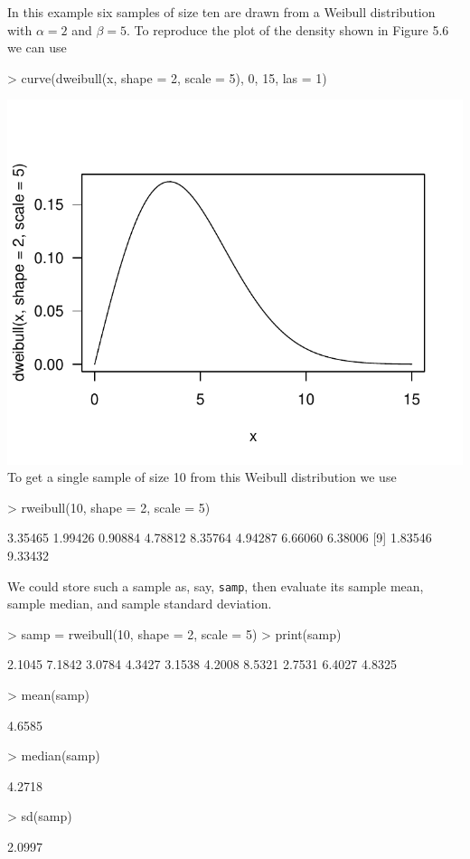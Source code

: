 \documentclass{book}
\begin{document}
In this example six samples of size ten are drawn from a Weibull
distribution with $\alpha=2$ and $\beta=5$.  To reproduce the plot of
the density shown in Figure 5.6 we can use
\begin{Schunk}
\begin{Sinput}
> curve(dweibull(x, shape = 2, scale = 5), 0, 15, las = 1)
\end{Sinput}
\end{Schunk}
\includegraphics{Devore6-xmp0519a}
To get a single sample of size 10 from this Weibull distribution we use
\begin{Schunk}
\begin{Sinput}
> rweibull(10, shape = 2, scale = 5)
\end{Sinput}
\begin{Soutput}
 [1] 3.35465 1.99426 0.90884 4.78812 8.35764 4.94287 6.66060 6.38006
 [9] 1.83546 9.33432
\end{Soutput}
\end{Schunk}
We could store such a sample as, say, \texttt{samp}, then evaluate its
sample mean, sample median, and sample standard deviation.
\begin{Schunk}
\begin{Sinput}
> samp = rweibull(10, shape = 2, scale = 5)
> print(samp)
\end{Sinput}
\begin{Soutput}
 [1] 2.1045 7.1842 3.0784 4.3427 3.1538 4.2008 8.5321 2.7531 6.4027 4.8325
\end{Soutput}
\begin{Sinput}
> mean(samp)
\end{Sinput}
\begin{Soutput}
[1] 4.6585
\end{Soutput}
\begin{Sinput}
> median(samp)
\end{Sinput}
\begin{Soutput}
[1] 4.2718
\end{Soutput}
\begin{Sinput}
> sd(samp)
\end{Sinput}
\begin{Soutput}
[1] 2.0997
\end{Soutput}
\end{Schunk}
\end{document}
